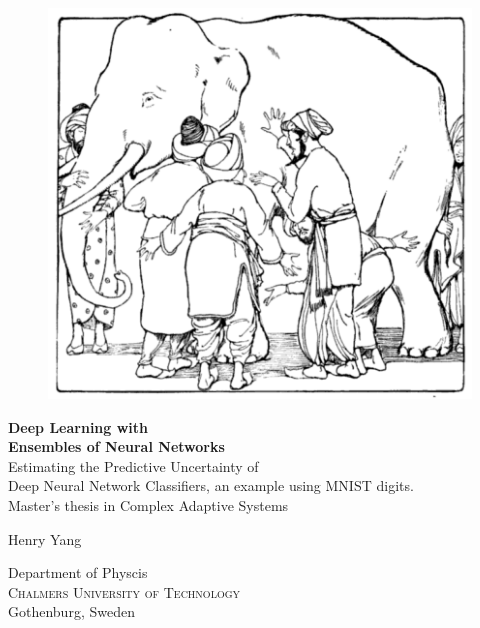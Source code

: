 
\begin{titlepage}
			
\addtolength{\voffset}{2cm}

\begin{figure}[H]
\centering
\vspace{2cm}	%
\includegraphics[height=0.5\linewidth]{figure/Blind_men_and_elephant.png}
\end{figure}

\mbox{}
\vfill
\renewcommand{\familydefault}{\sfdefault} \normalfont %
\textbf{{\Huge Deep Learning with \\ Ensembles of Neural Networks}} 	\\[0.5cm]
{\Large Estimating the Predictive Uncertainty of \\Deep Neural Network Classifiers, an example using MNIST digits.}\\[0.5cm]
Master's thesis in Complex Adaptive Systems \setlength{\parskip}{0.75cm}

{\Large Henry Yang} \setlength{\parskip}{2.9cm}

Department of Physcis \\
\textsc{Chalmers University of Technology} \\
Gothenburg, Sweden \the\year

\renewcommand{\familydefault}{\rmdefault} \normalfont %
\end{titlepage}


\newpage
\restoregeometry
\thispagestyle{empty}
\mbox{}


